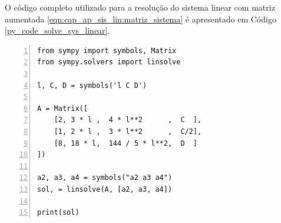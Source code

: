 \documentclass[
	12pt,				%
	openright,			%
    twoside,			%
	a4paper,			%
	english,			%
	french,				%
	spanish,			%
	brazil				%
	]{abntex2}
\numberwithin{lema}{chapter}
\numberwithin{teorema}{chapter}
\numberwithin{definicao}{chapter}
\numberwithin{exemplo}{chapter}
\numberwithin{figure}{chapter}
\begin{document}
\begin{apendicesenv}
{	O código completo utilizado para a resolução do sistema linear com matriz aumentada \eqref{eqn:cap_ap_sis_lin:matriz_sistema} é apresentado em Código \ref{py_code_solve_sys_linear}.
		
	\begin{lstlisting}[style=Python, xleftmargin=2em, numbers=left, caption=Resolução de Sistemas Lineares em Python, captionpos=t, label=py_code_solve_sys_linear]
from sympy import symbols, Matrix
from sympy.solvers import linsolve

l, C, D = symbols('l C D')

A = Matrix([
    [2, 3 * l ,  4 * l**2      ,  C  ],
    [1, 2 * l ,  3 * l**2      ,  C/2],
    [8, 18 * l,  144 / 5 * l**2,  D  ]
])

a2, a3, a4 = symbols("a2 a3 a4")
sol, = linsolve(A, [a2, a3, a4])

print(sol)
	\end{lstlisting}
}

\end{apendicesenv}

\printindex
\end{document}
